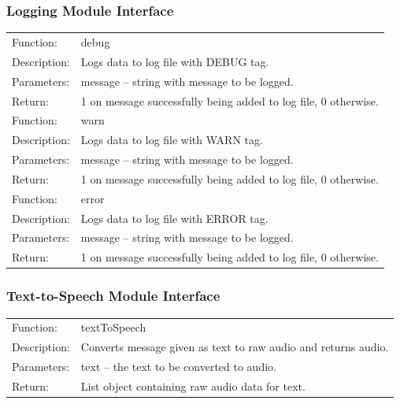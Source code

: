 \documentclass[onecolumn, draftclsnofoot,10pt, compsoc]{IEEEtran}
\begin{document}
        \subsubsection{Logging Module Interface}
            \begin{tabular}[t]{l p{6in}}
                \hline
                Function: & debug \\
                Description: & Logs data to log file with DEBUG tag. \\
                Parameters: & message -- string with message to be logged. \\
                Return: & 1 on message successfully being added to log file, 0 otherwise. \\
                \hline
                Function: & warn \\
                Description: & Logs data to log file with WARN tag. \\
                Parameters: & message -- string with message to be logged. \\
                Return: & 1 on message successfully being added to log file, 0 otherwise. \\
                \hline
                Function: & error \\
                Description: & Logs data to log file with ERROR tag. \\
                Parameters: & message -- string with message to be logged. \\
                Return: & 1 on message successfully being added to log file, 0 otherwise. \\
                \hline
            \end{tabular}
            
        \subsubsection{Text-to-Speech Module Interface}
            \begin{tabular}[t]{l p{6in}}
                \hline
                Function: & textToSpeech \\
                Description: & Converts message given as text to raw audio and returns audio. \\
                Parameters: & text -- the text to be converted to audio. \\
                Return: & List object containing raw audio data for text. \\
                \hline
            \end{tabular}
 
\end{document}
